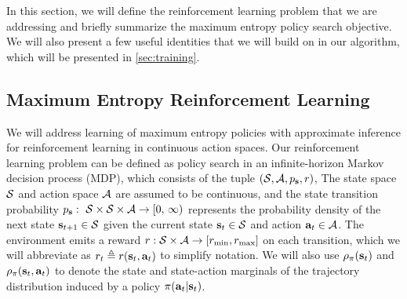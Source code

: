 \documentclass{article}
\begin{document}
In this section, we will define the reinforcement learning problem that we are addressing and briefly summarize the maximum entropy policy search objective. We will also present a few useful identities that we will build on in our algorithm, which will be presented in \autoref{sec:training}.

\vspace{-2mm}
\subsection{Maximum Entropy Reinforcement Learning}
\label{sec:maxent}

We will address learning of maximum entropy policies with approximate inference for reinforcement learning in continuous action spaces. Our reinforcement learning problem can be defined as policy search in an infinite-horizon Markov decision process (MDP), which consists of the tuple
$(\mathcal{S}, \mathcal{A}, p_{\mathbf{s}}, r)$,
The state space $\mathcal{S}$ and action space $\mathcal{A}$ are assumed to be continuous, and the state transition probability $\pdyn:\ \sspace \times \sspace \times \aspace \rightarrow [0,\, \infty)$ represents the probability density of the next state ${\mathbf{s}_{t+1}}\in\mathcal{S}$ given the current state ${\mathbf{s}_t}\in\mathcal{S}$ and action ${\mathbf{a}_t}\in\mathcal{A}$. The environment emits a reward $r: \mathcal{S} \times \mathcal{A} \rightarrow  [r_\mathrm{min},r_\mathrm{max}]$ on each transition, which we will abbreviate as $r_t\triangleq r({\mathbf{s}_t}, {\mathbf{a}_t})$ to simplify notation. We will also use $\rho_\pi({\mathbf{s}_t})$ and $\rho_\pi({\mathbf{s}_t},{\mathbf{a}_t})$ to denote the state and state-action marginals of the trajectory distribution induced by a policy $\pi({\mathbf{a}_t}|{\mathbf{s}_t})$. 
\end{document}
